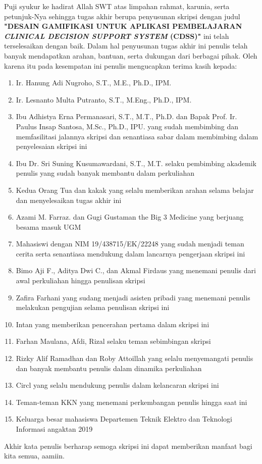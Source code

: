 
Puji syukur ke hadirat Allah SWT atas limpahan rahmat, karunia, serta petunjuk-Nya sehingga tugas akhir berupa penyusunan skripsi 
dengan judul \textbf{"DESAIN GAMIFIKASI UNTUK APLIKASI PEMBELAJARAN \textit{CLINICAL DECISION SUPPORT SYSTEM} (CDSS)"}
ini telah terselesaikan dengan baik. Dalam hal penyusunan tugas akhir ini penulis telah banyak mendapatkan arahan, bantuan, serta dukungan dari berbagai pihak. 
Oleh karena itu pada kesempatan ini penulis mengucapkan terima kasih kepada:

\begin{enumerate}
	\item Ir. Hanung Adi Nugroho, S.T., M.E., Ph.D., IPM.
	\item Ir. Lesnanto Multa Putranto, S.T., M.Eng., Ph.D., IPM.
	\item Ibu Adhistya Erna Permanasari, S.T., M.T., Ph.D. dan Bapak Prof. Ir. Paulus Insap Santosa, M.Sc., Ph.D., IPU. yang sudah membimbing dan memfasilitasi jalannya skripsi dan senantiasa sabar dalam membimbing dalam penyelesaian skripsi ini
	\item Ibu Dr. Sri Suning Kusumawardani, S.T., M.T. selaku pembimbing akademik penulis yang sudah banyak membantu dalam perkuliahan
	\item Kedua Orang Tua dan kakak yang selalu memberikan arahan selama belajar dan menyelesaikan tugas akhir ini
	\item Azami M. Farraz. dan Gugi Gustaman the Big 3 Medicine yang berjuang besama masuk UGM
	\item Mahasiswi dengan NIM 19/438715/EK/22248 yang sudah menjadi teman cerita serta senantiasa mendukung dalam lancarnya pengerjaan skripsi ini
	\item Bimo Aji F., Aditya Dwi C., dan Akmal Firdaus yang menemani penulis dari awal perkuliahan hingga penulisan skripsi
	\item Zafira Farhani yang sudang menjadi asisten pribadi yang menemani penulis melakukan pengujian selama penulisan skripsi ini
	\item Intan yang memberikan pencerahan pertama dalam skripsi ini
	\item Farhan Maulana, Afdi, Rizal selaku teman sebimbingan skripsi
	\item Rizky Alif Ramadhan dan Roby Attoillah yang selalu menyemangati penulis dan banyak membantu penulis dalam dinamika perkuliahan
	\item Circl yang selalu mendukung penulis dalam kelancaran skripsi ini
	\item Teman-teman KKN yang menemani perkembangan penulis hingga saat ini
	\item Keluarga besar mahasiswa Departemen Teknik Elektro dan Teknologi Informasi angaktan 2019
\end{enumerate}

Akhir kata penulis berharap semoga skripsi ini dapat memberikan manfaat bagi kita semua, aamiin.

